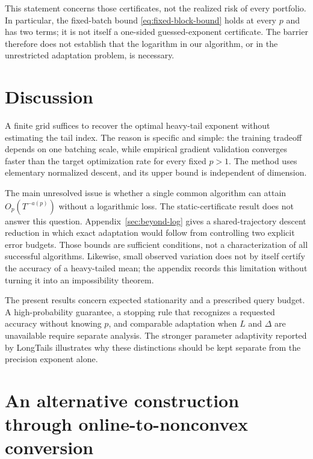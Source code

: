 \documentclass[11pt,a4paper]{article}
\theoremstyle{definition}
\theoremstyle{remark}
\begin{document}
This statement concerns those certificates, not the realized risk of
every portfolio. In particular, the fixed-batch bound
\eqref{eq:fixed-block-bound} holds at every $p$ and has two terms; it
is not itself a one-sided guessed-exponent certificate. The barrier
therefore does not establish that the logarithm in our algorithm, or
in the unrestricted adaptation problem, is necessary.

\section{Discussion}\label{sec:discussion}

A finite grid suffices to recover the optimal heavy-tail exponent
without estimating the tail index. The reason is specific and simple:
the training tradeoff depends on one batching scale, while empirical
gradient validation converges faster than the target optimization rate
for every fixed $p>1$. The method uses elementary normalized descent,
and its upper bound is independent of dimension.

The main unresolved issue is whether a single common algorithm can
attain $O_p(T^{-a(p)})$ without a logarithmic loss. The static-certificate
result does not answer this question. Appendix~\ref{sec:beyond-log}
gives a shared-trajectory descent reduction in which exact adaptation
would follow from controlling two explicit error budgets. Those bounds
are sufficient conditions, not a characterization of all successful
algorithms. Likewise, small observed variation does not by itself
certify the accuracy of a heavy-tailed mean; the appendix records this
limitation without turning it into an impossibility theorem.

The present results concern expected stationarity and a prescribed
query budget. A high-probability guarantee, a stopping rule that
recognizes a requested accuracy without knowing $p$, and comparable
adaptation when $L$ and $\Delta$ are unavailable require separate
analysis. The stronger parameter adaptivity reported by LongTails
\cite{longtails2026stationarity} illustrates why these distinctions
should be kept separate from the precision exponent alone.

\appendix


\section{An alternative construction through online-to-nonconvex conversion}
\label{app:o2nc}
\end{document}

